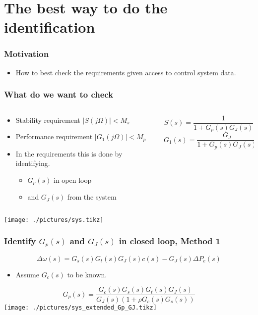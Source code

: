 \section{The best way to do the identification}
\begin{frame}
	\frametitle{Motivation}
	\begin{itemize}
		\item How to best check the requirements given access to control system data.
	\end{itemize}
\end{frame}
\begin{frame}
	\frametitle{What do we want to check}
	\begin{columns}
		\begin{column}{0.6\textwidth}
			\begin{itemize}
				\item Stability requirement $|S(j\Omega)| < M_s$
				\item Performance requirement $|G_1(j\Omega)| < M_p$
				\item In the requirements this is done by identifying.
			\begin{itemize}
				\item $G_p(s)$ in open loop 
				\item and $G_J(s)$ from the system
			\end{itemize}
		\end{itemize}
		\end{column}
		\begin{column}{0.4\textwidth}
			\begin{equation*}
				S(s) = \frac{1}{1+G_p(s)G_J(s)}
			\end{equation*}
			\begin{equation*}
				G_1(s) = \frac{G_{J}}{1+G_p(s)G_J(s)}
			\end{equation*}
		\end{column}
	\end{columns}
	\texttt{[image: ./pictures/sys.tikz]}
\end{frame}
\begin{frame}
		\frametitle{Identify $G_p(s)$ and $G_J(s)$ in closed loop, Method 1}
	\begin{equation}
		\Delta \omega(s) = G_s(s)G_t(s)G_J(s)c(s)- G_J(s)\Delta P_{e}(s)
	\end{equation}
	\begin{itemize}
		\item Assume $G_c(s)$ to be known.
	\end{itemize}
	\begin{equation}
		G_p(s) = \frac{G_c(s)G_s(s)G_t(s)G_J(s)}{G_J(s)(1+\rho G_c(s)G_s(s))}
	\end{equation}
	\texttt{[image: ./pictures/sys\_extended\_Gp\_GJ.tikz]}
\end{frame}
